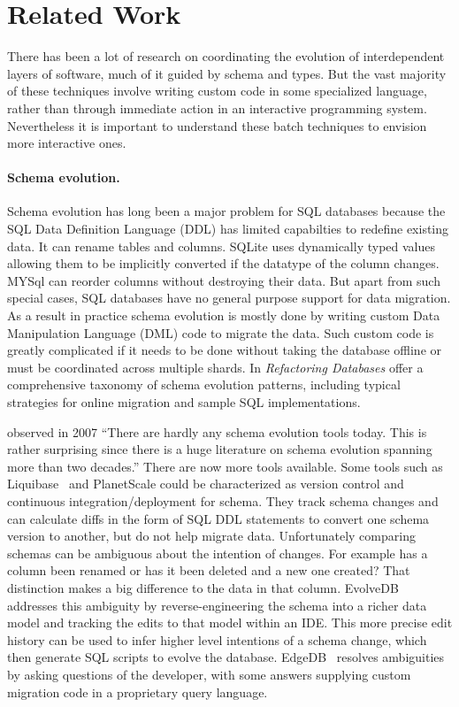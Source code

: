\documentclass[english,submission]{programming}
\begin{document}
\section{Related Work}
\label{sec:related}

There has been a lot of research on coordinating the evolution of interdependent layers of software, much of it guided by schema and types. But the vast majority of these techniques involve writing custom code in some specialized language, rather than through immediate action in an interactive programming system. Nevertheless it is important to understand these batch techniques to envision more interactive ones.

\paragraph{Schema evolution.}
Schema evolution has long been a major problem for SQL databases because
the SQL Data Definition Language (DDL) has limited capabilties to redefine existing data. It can rename tables and columns. SQLite \cite{sqliteDatatypes} uses dynamically typed values allowing them to be implicitly converted if the datatype of the column changes.
MYSql \cite{mysqlAlterTable} can reorder columns without destroying their data. But apart from such special cases, SQL databases have no general purpose support for data migration. As a result in practice schema evolution is mostly done by writing custom Data Manipulation Language (DML) code to migrate the data. Such custom code is greatly complicated if it needs to be done without taking the database offline or must be coordinated across multiple shards.
In \emph{Refactoring Databases} \citet{ambler06} offer a comprehensive taxonomy of schema evolution patterns, including typical strategies for online migration and sample SQL implementations.

\citet{bernstein07} observed in 2007 ``There are hardly any schema evolution tools today. This is rather surprising since there is a huge literature on schema evolution spanning more than two decades.'' There are now more tools available. Some tools such as Liquibase~\cite{liquibase} and PlanetScale\cite{planetscale} could be characterized as version control and continuous integration/deployment for schema. They track schema changes and can calculate diffs in the form of SQL DDL statements to convert one schema version to another, but do not help migrate data. Unfortunately comparing schemas can be ambiguous about the intention of changes. For example has a column been renamed or has it been deleted and a new one created? That distinction makes a big difference to the data in that column. EvolveDB\cite{evolvedb} addresses this ambiguity by reverse-engineering the schema into a richer data model and tracking the edits to that model within an IDE. This more precise edit history can be used to infer higher level intentions of a schema change, which then generate SQL scripts to evolve the database. EdgeDB~\cite{edgedb} resolves ambiguities by asking questions of the developer, with some answers supplying custom migration code in a proprietary query language.
\end{document}
